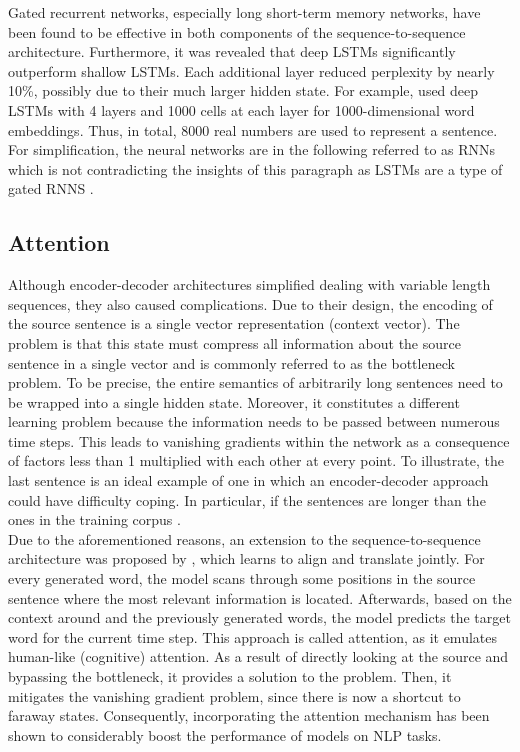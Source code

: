 \documentclass[
]{krantz}
\begin{document}
Gated recurrent networks, especially long short-term memory networks,
have been found to be effective in both components of the
sequence-to-sequence architecture. Furthermore, it was revealed that
deep LSTMs significantly outperform shallow LSTMs. Each additional layer
reduced perplexity by nearly 10\%, possibly due to their much larger
hidden state. For example, \citet{Sutskever2014} used deep LSTMs with 4
layers and 1000 cells at each layer for 1000-dimensional word
embeddings. Thus, in total, 8000 real numbers are used to represent a
sentence. For simplification, the neural networks are in the following
referred to as RNNs which is not contradicting the insights of this
paragraph as LSTMs are a type of gated RNNS \citep{Sutskever2014}.

\hypertarget{attention}{%
\subsection{Attention}\label{attention}}

Although encoder-decoder architectures simplified dealing with variable
length sequences, they also caused complications. Due to their design, the
encoding of the source sentence is a single vector representation
(context vector). The problem is that this state must compress all
information about the source sentence in a single vector and is commonly
referred to as the bottleneck problem. To be precise, the entire
semantics of arbitrarily long sentences need to be wrapped into a single
hidden state. Moreover, it constitutes a different learning problem
because the information needs to be passed between numerous time steps.
This leads to vanishing gradients within the network as a consequence of
factors less than 1 multiplied with each other at every point. To
illustrate, the last sentence is an ideal example of one in which an
encoder-decoder approach could have difficulty coping. In particular, if
the sentences are longer than the ones in the training corpus
\citep{Manning2022}.\\

Due to the aforementioned reasons, an extension to the
sequence-to-sequence architecture was proposed by \citet{Bahdanau2014}, which
learns to align and translate jointly. For every generated word, the
model scans through some positions in the source sentence where the most
relevant information is located. Afterwards, based on the context around
and the previously generated words, the model predicts the target word
for the current time step. This approach is called attention, as it
emulates human-like (cognitive) attention. As a result of directly
looking at the source and bypassing the bottleneck, it provides a
solution to the problem. Then, it mitigates the vanishing gradient
problem, since there is now a shortcut to faraway states. Consequently,
incorporating the attention mechanism has been shown to considerably
boost the performance of models on NLP tasks.\\
\end{document}
